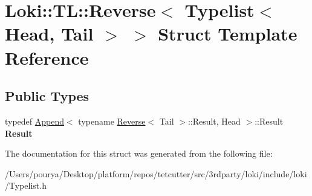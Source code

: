 \hypertarget{structLoki_1_1TL_1_1Reverse_3_01Typelist_3_01Head_00_01Tail_01_4_01_4}{}\section{Loki\+:\+:T\+L\+:\+:Reverse$<$ Typelist$<$ Head, Tail $>$ $>$ Struct Template Reference}
\label{structLoki_1_1TL_1_1Reverse_3_01Typelist_3_01Head_00_01Tail_01_4_01_4}
\subsection*{Public Types}
\begin{DoxyCompactItemize}
\item 
\hypertarget{structLoki_1_1TL_1_1Reverse_3_01Typelist_3_01Head_00_01Tail_01_4_01_4_adf6811c6adca5b9358882ec12c0a4f87}{}typedef \hyperlink{structLoki_1_1TL_1_1Append}{Append}$<$ typename \hyperlink{structLoki_1_1TL_1_1Reverse}{Reverse}$<$ Tail $>$\+::Result, Head $>$\+::Result {\bfseries Result}\label{structLoki_1_1TL_1_1Reverse_3_01Typelist_3_01Head_00_01Tail_01_4_01_4_adf6811c6adca5b9358882ec12c0a4f87}

\end{DoxyCompactItemize}


The documentation for this struct was generated from the following file\+:\begin{DoxyCompactItemize}
\item 
/\+Users/pourya/\+Desktop/platform/repos/tetcutter/src/3rdparty/loki/include/loki/Typelist.\+h\end{DoxyCompactItemize}
